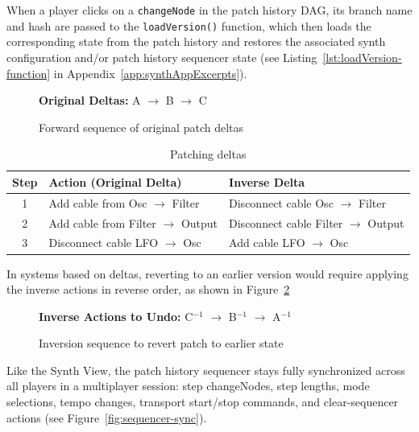 \documentclass[12pt]{yorkudiss}
\begin{document}
When a player clicks on a \texttt{changeNode} in the patch history DAG, its branch name and hash are passed to the \texttt{loadVersion()} function, which then loads the corresponding state from the patch history and restores the associated synth configuration and/or patch history sequencer state (see Listing~\ref{lst:loadVersion-function} in Appendix~\ref{app:synthAppExcerpts}).

\begin{figure}[ht]
  \centering
  \textbf{Original Deltas:} \quad A $\rightarrow$ B $\rightarrow$ C
  \caption[Patch Deltas]{Forward sequence of original patch deltas}
  \label{fig:original-deltas}
\end{figure}

\begin{table}[ht]
  \centering
  \begin{tabular}{c p{5.5cm} p{5.5cm}}
    \toprule
    \textbf{Step} & \textbf{Action (Original Delta)} & \textbf{Inverse Delta} \\
    \midrule
    1 & Add cable from Osc $\rightarrow$ Filter & Disconnect cable Osc $\rightarrow$ Filter \\
    2 & Add cable from Filter $\rightarrow$ Output & Disconnect cable Filter $\rightarrow$ Output \\
    3 & Disconnect cable LFO $\rightarrow$ Osc & Add cable LFO $\rightarrow$ Osc \\
    \bottomrule
  \end{tabular}
  \caption[Patching Deltas]{Patching deltas}
  \label{tab:patch-inversion}
\end{table}

In systems based on deltas, reverting to an earlier version would require applying the inverse actions in reverse order, as shown in Figure~\ref{fig:inverse-deltas}


\begin{figure}[ht]
  \centering
  \textbf{Inverse Actions to Undo:} \quad C$^{-1}$ $\rightarrow$ B$^{-1}$ $\rightarrow$ A$^{-1}$
  \caption[Patch Delta Inversions]{Inversion sequence to revert patch to earlier state}
  \label{fig:inverse-deltas}
\end{figure}

Like the Synth View, the patch history sequencer stays fully synchronized across all players in a multiplayer session: step changeNodes, step lengths, mode selections, tempo changes, transport start/stop commands, and clear-sequencer actions (see Figure~\ref{fig:sequencer-sync}). 
\end{document}
